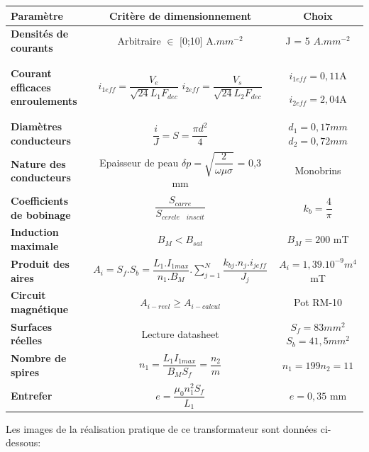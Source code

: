 \documentclass[12pt]{article}
\begin{document}
\vspace{15pt}
\hspace{-80pt}
\begin{tabular}{|>{\bf}l|c|c|} \hline
Paramètre & \textbf{Critère de dimensionnement} & \textbf{Choix} \\ \hline
Densités de courants  & Arbitraire $\in$ [0;10] A.$mm^{-2}$ & J = 5 $A.mm^{-2}$\\\hline Courant efficaces enroulements & $i_{1eff} = \dfrac{V_e}{\sqrt{24}L_1F_{dec}}$ \quad $i_{2eff} = \dfrac{V_s}{\sqrt{24}L_2F_{dec}}$  &$i_{1eff} = 0,11 $A \par  $i_{2eff} = 2,04$A\\ \hline
Diamètres conducteurs & $\dfrac{i}{J} = S = \dfrac{\pi d^2}{4}$ &  $d_1 = 0,17 mm$ \quad $d_2 = 0,72mm$\\\hline
Nature des conducteurs & Epaisseur de peau $\delta p = \sqrt{\dfrac{2}{\omega\mu \sigma}}$ = 0,3 mm &  Monobrins\\\hline
Coefficients de bobinage & $\dfrac{S_{carre}}{S_{cercle \quad inscit}}$ & $k_b =  \dfrac{4}{\pi}$\\\hline
Induction maximale & $B_M < B_{sat}$ & $B_M = 200$ mT\\\hline
Produit des aires & $A_i = S_f.S_b = \dfrac{L_1.I_{1max}}{n_1.B_M}.\sum_{j=1}^N\dfrac{k_{bj}.n_j.i_{jeff}}{J_j} $ & $A_i = 1,39.10^{-9} m^4$ mT\\\hline
Circuit magnétique & $A_{i-reel} \geq A_{i-calcul}$ & Pot RM-10\\\hline
Surfaces réelles & Lecture datasheet & $S_f = 83 mm^2$\quad $S_b = 41,5 mm^2$\\\hline
Nombre de spires & $n_1 = \dfrac{L_1I_{1max}}{B_MS_f} = \dfrac{n_2}{m}$ & $n_1 = 199 $\quad $n_2 = 11$\\\hline
Entrefer & $e = \dfrac{\mu_0n_1^2S_f}{L_1}$ & $e = 0,35 $ mm\\\hline



\end{tabular}


\vspace{10pt}

Les images de la réalisation pratique de ce transformateur sont données ci-dessous:\par
\vspace{15pt}
\end{document}
